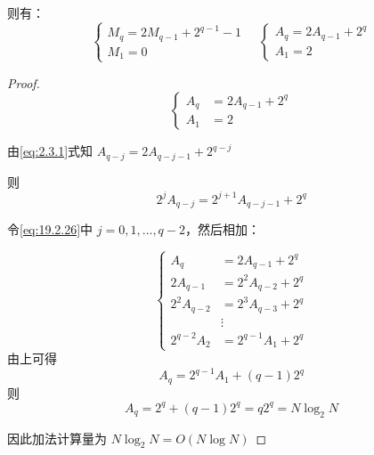 \documentclass[linespread=1.5,openany]{book}%
\theoremstyle{plain}
\begin{document}
{{{					则有：
					\[
					\begin{cases}
						M_q = 2M_{q - 1} + 2^{q - 1} - 1 \\
						M_1 = 0
					\end{cases}
					\quad
					\begin{cases}
						A_q = 2A_{q - 1} + 2^q \\
						A_1 = 2
					\end{cases}
					\]
					\begin{proof}
						\begin{equation}\label{eq:2.3.1}
							\left\{
							\begin{aligned}
								A_q &= 2 A_{q-1} + 2^q  \\[8pt]
								A_1 &= 2
							\end{aligned}
							\right.
						\end{equation}
						
						由\eqref{eq:2.3.1}式知 \(A_{q-j} = 2 A_{q-j-1} + 2^{q-j}\)
						
						则
						\begin{equation}\label{eq:19.2.26}
							2^j A_{q-j} = 2^{j+1} A_{q-j-1} + 2^q 
						\end{equation}
						
						
						令\eqref{eq:19.2.26}中 \(j = 0,1,\ldots,q-2\)，然后相加：
						
						\begin{equation}
							\left\{
							\begin{aligned}
								A_q &= 2 A_{q-1} + 2^q \\[8pt]
								2 A_{q-1} &= 2^2 A_{q-2} + 2^q \\[8pt]
								2^2 A_{q-2} &= 2^3 A_{q-3} + 2^q \\[8pt]
								&\vdots \\[8pt]
								2^{q-2} A_2 &= 2^{q-1} A_1 + 2^q
							\end{aligned}
							\right.
						\end{equation}
						由上可得
						\begin{equation}
							A_q = 2^{q-1} A_1 + (q-1) 2^q
						\end{equation}
						则 
						\begin{equation}
							A_q = 2^q + (q-1) 2^q = q 2^q = N \log_2 N
						\end{equation}
						
						因此加法计算量为 \(N \log_2 N = O(N \log N)\)
						

\end{proof}}}}
\end{document}
